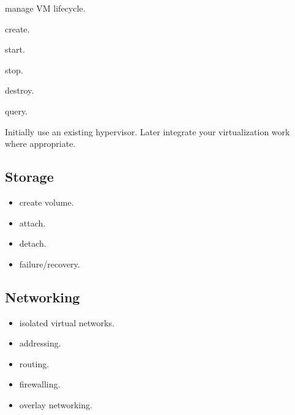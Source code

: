 \documentclass[11pt,letterpaper]{article}
\begin{document}
\begin{topics}

\item manage VM lifecycle.

\item create.

\item start.

\item stop.

\item destroy.

\item query.

\end{topics}

Initially use an existing hypervisor. Later integrate your virtualization work where appropriate.

\subsection*{Storage}

\begin{itemize}

\item create volume.

\item attach.

\item detach.

\item failure/recovery.

\end{itemize}

\subsection*{Networking}

\begin{itemize}

\item isolated virtual networks.

\item addressing.

\item routing.

\item firewalling.

\item overlay networking.

\end{itemize}
\end{document}
